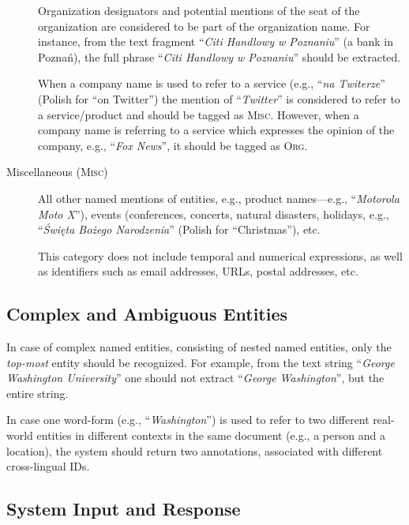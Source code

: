 \documentclass[11pt]{article}
\begin{document}
\begin{description}
  Organization designators and potential mentions of the seat of the organization are
  considered to be part of the organization name. For instance, from the text fragment
  ``\textit{Citi Handlowy w Poznaniu}'' (a bank in Poznań), the full phrase ``\textit{Citi
    Handlowy w Poznaniu}'' should be extracted.
			
  When a company name is used to refer to a service (e.g., ``\textit{na Twiterze}'' (Polish
  for ``on Twitter'') the mention of ``\textit{Twitter}'' is considered to refer to a
  service/product and should be tagged as \textsc{Misc}.  However, when a company name is
  referring to a service which expresses the opinion of the company, e.g., ``\textit{Fox
    News}'', it should be tagged as \textsc{Org}.

\item[Miscellaneous (\textsc{Misc})]

  All other named mentions of entities, e.g., product names---e.g., ``\textit{Motorola Moto
    X}''), events (conferences, concerts, natural disasters, holidays, e.g., ``\textit{Święta
    Bożego Narodzenia}'' (Polish for ``Christmas''), etc.

  This category does not include temporal and numerical expressions, as well as identifiers
  such as email addresses, URLs, postal addresses, etc.

\end{description}



\subsection{Complex and Ambiguous Entities}

In case of complex named entities, consisting of nested named entities, only the {\em
  top-most} entity should be recognized. For example, from the text string ``\textit{George
  Washington University}'' one should not extract ``\textit{George Washington}'', but the
entire string.

In case one word-form (e.g., ``\textit{Washington}'') is used to refer to two different
real-world entities in different contexts in the same document (e.g., a person and a
location), the system should return two annotations, associated with different cross-lingual
IDs.


\subsection{System Input and Response}
\label{sec:protocol}
\end{document}
